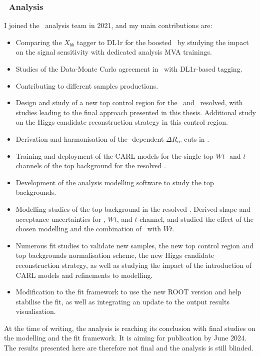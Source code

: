 \subsubsection{\boldvhbc\ Analysis}
I joined the \vhbc\ analysis team in 2021, and my main contributions are:
\begin{itemize}
    \item Comparing the $X_{bb}$ tagger to DL1r for the boosted \vhb\ by studying the impact on the signal sensitivity with dedicated analysis MVA trainings.
    \item Studies of the Data-Monte Carlo agreement in \vhc\ with DL1r-based tagging. 
    \item Contributing to different samples productions.
    \item Design and study of a new top control region for the \vhc\ and \vhb\ resolved, with studies leading to the final approach presented in this thesis. Additional study on the Higgs candidate reconstruction strategy in this control region.
    \item Derivation and harmonisation of the \ptv-dependent $\Delta R_{cc}$ cuts in \vhc.
    \item Training and deployment of the CARL models for the single-top $Wt$- and $t$-channels of the top background for the resolved \vhb.
    \item Development of the analysis modelling software to study the top backgrounds. 
    \item Modelling studies of the top background in the resolved \vhb. Derived shape and acceptance uncertainties for \ttb, $Wt$, and $t$-channel, and studied the effect of the chosen modelling and the combination of \ttb\ with $Wt$. 
    \item Numerous fit studies to validate new samples, the new top control region and top backgrounds normalisation scheme, the new Higgs candidate reconstruction strategy, as well as studying the impact of the introduction of CARL models and refinements to modelling. 
    \item Modification to the fit framework to use the new ROOT version and help stabilise the fit, as well as integrating an update to the output results visualisation.
\end{itemize}
At the time of writing, the analysis is reaching its conclusion with final studies on the modelling and the fit framework. It is aiming for publication by June 2024. The results presented here are therefore not final and the analysis is still blinded.